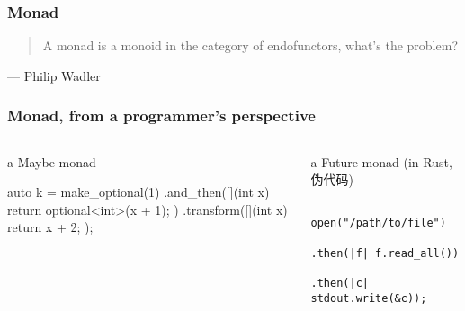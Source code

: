 \documentclass[UTF8,lualatex]{ctexbeamer}
\newcommand{\pagequote}[2]{
  \Large
  \begin{quotation}
      #1
  \end{quotation}
  \flushright\normalsize --- {#2}
}
\begin{document}
\begin{frame}
    \frametitle{Monad}
    \pagequote
    {A monad is a monoid in the category of endofunctors, what's the problem?}
    {Philip Wadler}
\end{frame}


\begin{frame}[fragile]
    \frametitle{Monad, from a programmer's perspective}
    \begin{columns}[t]
        \footnotesize
        \begin{column}{.5\textwidth}
            \begin{exampleblock}{a Maybe monad}
                \begin{cppcode}
                    auto k = make_optional(1)
                        .and_then([](int x) {
                            return optional<int>(x + 1);
                        })
                        .transform([](int x) {
                            return x + 2;
                        });
                \end{cppcode}
            \end{exampleblock}
        \end{column}
        \begin{column}{.5\textwidth}
            \begin{exampleblock}{a Future monad (in Rust, 伪代码)}
                \begin{verbatim}
                    open("/path/to/file")
                        .then(|f| f.read_all())
                        .then(|c| stdout.write(&c));
                \end{verbatim}
            \end{exampleblock}
        \end{column}
    \end{columns}
\end{frame}
\end{document}
